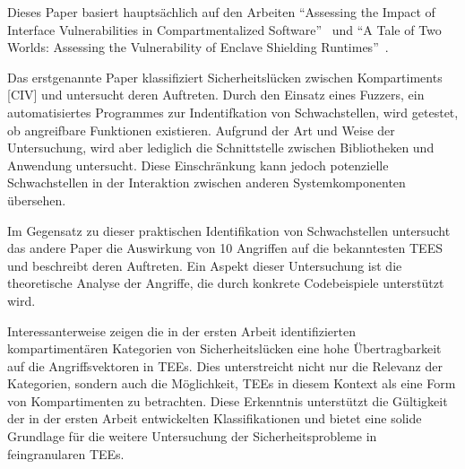 Dieses Paper basiert hauptsächlich auf den Arbeiten \enquote{Assessing the Impact of Interface Vulnerabilities in Compartmentalized Software}~\cite{CIVPaper} und \enquote{A Tale of Two Worlds: Assessing the Vulnerability of Enclave Shielding Runtimes}~\cite{TEEPaper}. 

Das erstgenannte Paper klassifiziert Sicherheitslücken zwischen Kompartiments [CIV] und untersucht deren Auftreten. Durch den Einsatz eines Fuzzers, ein automatisiertes Programmes zur Indentifkation von Schwachstellen, wird getestet, ob angreifbare Funktionen existieren. Aufgrund der Art und Weise der Untersuchung, wird aber lediglich die Schnittstelle zwischen Bibliotheken und Anwendung untersucht. Diese Einschränkung kann jedoch potenzielle Schwachstellen in der Interaktion zwischen anderen Systemkomponenten übersehen.

Im Gegensatz zu dieser praktischen Identifikation von Schwachstellen untersucht das andere Paper die Auswirkung von 10 Angriffen auf die bekanntesten TEES und beschreibt deren Auftreten. Ein Aspekt dieser Untersuchung ist die theoretische Analyse der Angriffe, die durch konkrete Codebeispiele unterstützt wird. 

Interessanterweise zeigen die in der ersten Arbeit identifizierten kompartimentären Kategorien von Sicherheitslücken eine hohe Übertragbarkeit auf die Angriffsvektoren in TEEs. Dies unterstreicht nicht nur die Relevanz der Kategorien, sondern auch die Möglichkeit, TEEs in diesem Kontext als eine Form von Kompartimenten zu betrachten. Diese Erkenntnis unterstützt die Gültigkeit der in der ersten Arbeit entwickelten Klassifikationen und bietet eine solide Grundlage für die weitere Untersuchung der Sicherheitsprobleme in feingranularen TEEs.
